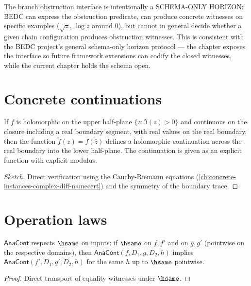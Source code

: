 \begin{remark}
\label{rem:branch-obstruction-horizon}
The branch obstruction interface is intentionally a SCHEMA-ONLY HORIZON: BEDC can express the obstruction predicate, can produce concrete witnesses on specific examples (\(\sqrt{z}\), \(\log z\) around 0), but cannot in general decide whether a given chain configuration produces obstruction witnesses. This is consistent with the BEDC project's general schema-only horizon protocol --- the chapter exposes the interface so future framework extensions can codify the closed witnesses, while the current chapter holds the schema open.
\end{remark}

\section{Concrete continuations}

\begin{theorem}
\label{thm:schwartz-reflection}
If \(f\) is holomorphic on the upper half-plane \(\{z : \Im(z) > 0\}\) and continuous on the closure including a real boundary segment, with real values on the real boundary, then the function \(\tilde{f}(z) = \overline{f(\bar{z})}\) defines a holomorphic continuation across the real boundary into the lower half-plane. The continuation is given as an explicit function with explicit modulus.
\end{theorem}
\begin{proof}[Sketch]
Direct verification using the Cauchy-Riemann equations (\autoref{ch:concrete-instances-complex-diff-namecert}) and the symmetry of the boundary trace.
\end{proof}

\section{Operation laws}

\begin{lemma}[Functoriality]
\label{lem:ana-cont-functorial}
\(\mathsf{AnaCont}\) respects \(\hsame\) on inputs: if \(\hsame\) on \(f, f'\) and on \(g, g'\) (pointwise on the respective domains), then \(\mathsf{AnaCont}(f, D_1, g, D_2, h)\) implies \(\mathsf{AnaCont}(f', D_1, g', D_2, h)\) for the same \(h\) up to \(\hsame\) pointwise.
\end{lemma}
\begin{proof}
Direct transport of equality witnesses under \(\hsame\).
\end{proof}

